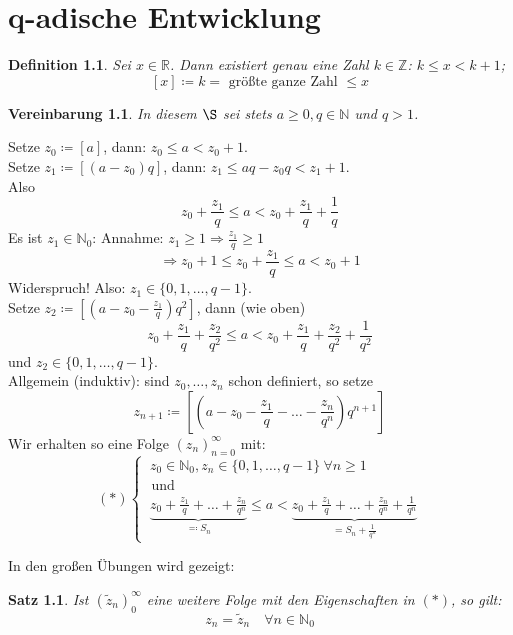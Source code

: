 \documentclass[12pt]{extreport} %
\newcommand{\N}{\mathbb{N}}
\newcommand{\R}{\mathbb{R}}
\newcommand{\Z}{\mathbb{Z}}
\theoremstyle{named}
\theoremstyle{dotless}
\newtheorem{satz}[unnamedtheorem]{Satz}
\newtheorem*{definition}{Definition}
\newtheorem*{vereinbarung}{Vereinbarung}
\begin{document}
\newpage


\chapter{q-adische Entwicklung}

\begin{definition}
	Sei $x \in \R$. Dann existiert genau eine Zahl $k \in \Z$: $k \leq x < k + 1$; 
		$$ [x] \coloneqq k = \text{ grö{\ss}te ganze Zahl } \leq x $$
	
\end{definition}


\begin{vereinbarung}
	In diesem $\S$ sei stets $a \geq 0, q \in \N$ und $q > 1$.
\end{vereinbarung}


Setze $z_{0} \coloneqq [a]$, dann: $z_{0} \leq a < z_{0} + 1$. \\
Setze $z_{1} \coloneqq [(a-z_{0})q]$, dann: $z_{1} \leq aq - z_{0}q < z_{1} + 1$. \\
Also
	$$ z_{0} + \frac{z_{1}}{q} \leq a < z_{0} + \frac{z_{1}}{q} + \frac{1}{q} $$
Es ist $z_{1} \in \N_{0}$: Annahme: $z_{1} \geq 1 \Rightarrow \frac{z_{1}}{q} \geq 1$
	$$ \Rightarrow z_{0} + 1 \leq z_{0} + \frac{z_{1}}{q} \leq a < z_{0} +1 $$
Widerspruch! Also: $z_{1} \in \{ 0, 1, \dotsc, q - 1 \}$. \\
Setze  $z_{2} \coloneqq [(a-z_{0}-\frac{z_{1}}{q})q^{2}]$, dann (wie oben)
	$$ z_{0} + \frac{z_{1}}{q} + \frac{z_{2}}{q^{2}} \leq a < z_{0} + \frac{z_{1}}{q} + \frac{z_{2}}{q^{2}} + \frac{1}{q^{2}} $$
und $z_{2} \in \{ 0, 1, \dotsc, q - 1 \}$. \\
Allgemein (induktiv): sind $z_{0}, \dotsc, z_{n}$ schon definiert, so setze
	$$ z_{n+1} \coloneqq [(a - z_{0} - \frac{z_{1}}{q} - \dotsc - \frac{z_{n}}{q^{n}}) q^{n+1}] $$
Wir erhalten so eine Folge $(z_{n})_{n=0}^{\infty}$ mit:
	$$ (*) \begin{cases} ~ z_{0} \in \N_{0}, z_{n} \in \{ 0, 1, \dotsc, q - 1 \} ~\forall n \geq 1 \\ \text{ und} \\ ~\underbrace{z_{0} + \frac{z_{1}}{q} + \dotsc + \frac{z_{n}}{q^{n}}}_{\eqqcolon S_{n}} \leq a < \underbrace{ z_{0} + \frac{z_{1}}{q} + \dotsc + \frac{z_{n}}{q^{n}} + \frac{1}{q^{n}}}_{= S_{n} + \frac{1}{q^{n}}} \end{cases} $$


In den gro{\ss}en Übungen wird gezeigt:

\begin{satz} \label{5.1:satz}
	Ist $(\tilde{z}_{n})_{0}^{\infty}$ eine weitere Folge mit den Eigenschaften in $(*)$, so gilt: 
	$$ z_{n} = \tilde{z}_{n} \quad \forall n \in \N_{0} $$
\end{satz}
\end{document}
